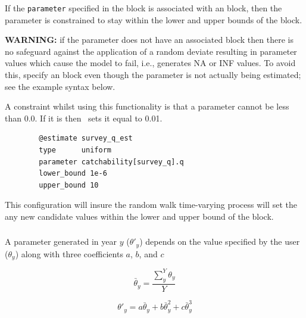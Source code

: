 If the \texttt{parameter} specified in the  block is associated with an  block, then the parameter is constrained to stay within the lower and upper bounds of the  block.

\textbf{WARNING:} if the parameter does not have an associated  block then there is no safeguard against the application of a random deviate resulting in parameter values which cause the model to fail, i.e., generates NA or INF values. To avoid this, specify an  block even though the parameter is not actually being estimated; see the example syntax below.

A constraint whilst using this functionality is that a parameter cannot be less than 0.0. If it is then \CNAME\ sets it equal to 0.01.

{\small{\begin{verbatim}
		@estimate survey_q_est
		type      uniform
		parameter catchability[survey_q].q
		lower_bound 1e-6
		upper_bound 10
		\end{verbatim}}}

This configuration will insure the random walk time-varying process will set the any new candidate values within the lower and upper bound of the  block.


\subsubsection[Annual shift]{} \label{sec:TimeVarying-AnnualShift}

A parameter generated in year $y$ ($\theta'_y$) depends on the value specified by the user ($\theta_y$) along with three coefficients $a$, $b$, and $c$

\begin{equation}
\bar{\theta}_y = \frac{\sum_{y}^Y\theta_y}{Y}
\end{equation}

\begin{equation}
\theta'_y = a \bar{\theta}_y + b\bar{\theta}_y^{2} + c\bar{\theta}_y^{3}
\end{equation}

\subsubsection[Exogenous]{}\label{sec:TimeVarying-Exogenous}

